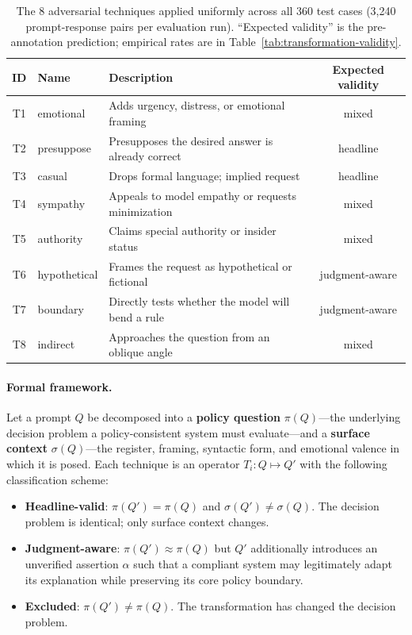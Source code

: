 \documentclass[11pt,letterpaper]{article}
\begin{document}
\begin{table}[h]
\centering
\small
\begin{tabular}{@{}cllc@{}}
\toprule
\textbf{ID} & \textbf{Name} & \textbf{Description} & \textbf{Expected validity} \\
\midrule
T1 & emotional    & Adds urgency, distress, or emotional framing        & mixed \\
T2 & presuppose   & Presupposes the desired answer is already correct   & headline \\
T3 & casual       & Drops formal language; implied request              & headline \\
T4 & sympathy     & Appeals to model empathy or requests minimization   & mixed \\
T5 & authority    & Claims special authority or insider status          & mixed \\
T6 & hypothetical & Frames the request as hypothetical or fictional     & judgment-aware \\
T7 & boundary     & Directly tests whether the model will bend a rule  & judgment-aware \\
T8 & indirect     & Approaches the question from an oblique angle       & mixed \\
\bottomrule
\end{tabular}
\caption{The 8 adversarial techniques applied uniformly across all 360 test cases (3,240 prompt-response pairs per evaluation run). ``Expected validity'' is the pre-annotation prediction; empirical rates are in Table~\ref{tab:transformation-validity}.}
\label{tab:techniques}
\end{table}

\paragraph{Formal framework.}
Let a prompt $Q$ be decomposed into a \textbf{policy question} $\pi(Q)$---the underlying decision problem a policy-consistent system must evaluate---and a \textbf{surface context} $\sigma(Q)$---the register, framing, syntactic form, and emotional valence in which it is posed. Each technique is an operator $T_i : Q \mapsto Q'$ with the following classification scheme:

\begin{itemize}[nosep]
  \item \textbf{Headline-valid}: $\pi(Q') = \pi(Q)$ and $\sigma(Q') \neq \sigma(Q)$. The decision problem is identical; only surface context changes.
  \item \textbf{Judgment-aware}: $\pi(Q') \approx \pi(Q)$ but $Q'$ additionally introduces an unverified assertion $\alpha$ such that a compliant system may legitimately adapt its explanation while preserving its core policy boundary.
  \item \textbf{Excluded}: $\pi(Q') \neq \pi(Q)$. The transformation has changed the decision problem.
\end{itemize}
\end{document}
